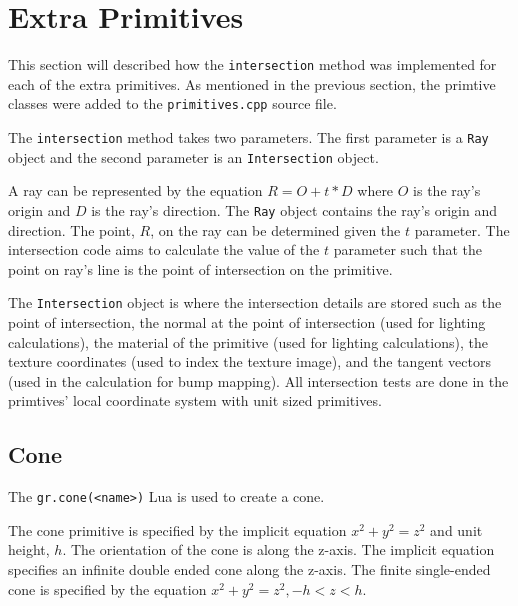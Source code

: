 \section{Extra Primitives}

This section will described how the \verb|intersection| method was
implemented for each of the extra primitives. As mentioned in the previous
section, the primtive classes were added to the \verb|primitives.cpp| source 
file.

The \verb|intersection| method takes two parameters. The first parameter is a
\verb|Ray| object and the second parameter is an \verb|Intersection| object. 

A ray can be represented by the equation $R = O + t*D$ where $O$ is the ray's 
origin and $D$ is the ray's direction. The \verb|Ray| object contains the ray's 
origin and direction. The point, $R$, on the ray can be determined given the $t$ 
parameter. The intersection code aims to calculate the value of the $t$ 
parameter such that the point on ray's line is the point of intersection on the 
primitive. 

The \verb|Intersection| object is where the intersection details are
stored such as the point of intersection, the normal at the point of
intersection (used for lighting calculations), the material of the primitive
(used for lighting calculations), the texture coordinates (used to index the
texture image), and the tangent vectors (used in the calculation for bump
mapping). All intersection tests are done in the primtives' local coordinate
system with unit sized primitives.

\subsection*{Cone}
The \verb|gr.cone(<name>)| Lua is used to create a cone.

The cone primitive is specified by the implicit equation $x^2 + y^2 = z^2$ and 
unit height, $h$. The orientation of the cone is along the z-axis. The implicit 
equation specifies an infinite double ended cone along the z-axis. The finite 
single-ended cone is specified by the equation $x^2 + y^2 = z^2, -h < z < h$. 

